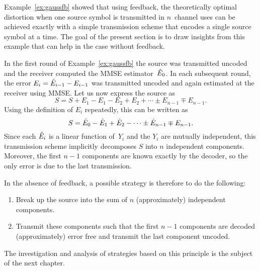 Example~\ref{ex:gaussfb} showed that using feedback, the theoretically optimal
distortion when one source symbol is transmitted in $n$~channel uses can be
achieved exactly with a simple transmission scheme that encodes a single source
symbol at a time. The goal of the present section is to draw insights from this
example that can help in the case without feedback. 

In the first round of Example~\ref{ex:gaussfb} the source was
transmitted uncoded and the receiver computed the MMSE estimator~$\hat{E}_0$. In
each subsequent round, the error $E_i = \hat{E}_{i-1} - E_{i-1}$ was transmitted
uncoded and again estimated at the receiver using MMSE. Let us now express the
source as
\begin{equation*}
  S = S + E_1 - E_1 - E_2 + E_2 + \cdots \pm E_{n-1} \mp E_{n-1}.
\end{equation*}
Using the definition of $E_i$ repeatedly, this can be written as
\begin{equation*}
  S = \hat{E}_0 - \hat{E}_1 + \hat{E}_2 - \cdots \pm \hat{E}_{n-1} \mp E_{n-1}.
\end{equation*}
Since each $\hat{E}_i$ is a linear function of~$Y_i$ and the $Y_i$ are mutually
independent, this transmission scheme implicitly decomposes $S$ into
$n$ independent components. Moreover, the first $n-1$ components are known
exactly by the decoder, so the only error is due to the last transmission.

In the absence of feedback, a possible strategy is therefore to do the
following:
\begin{enumerate}
  \item Break up the source into the sum of $n$ (approximately) independent
    components.
  \item Transmit these components such that the first $n-1$ components are
    decoded (approximately) error free and transmit the last component uncoded.
\end{enumerate}

The investigation and analysis of strategies based on this principle is the
subject of the next chapter. 

